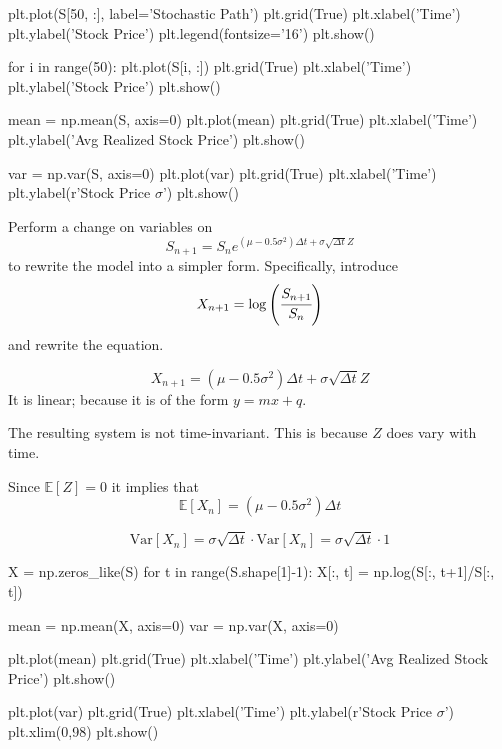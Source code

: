 \documentclass[12pt,a4paper]{book}
\begin{document}
\begin{solution}
\begin{ipython}
plt.plot(S[50, :], label='Stochastic Path')
plt.grid(True)
plt.xlabel('Time')
plt.ylabel('Stock Price')
plt.legend(fontsize='16')
plt.show()

for i in range(50):
    plt.plot(S[i, :])
plt.grid(True)
plt.xlabel('Time')
plt.ylabel('Stock Price')
plt.show()
\end{ipython}

\begin{ipython}
mean = np.mean(S, axis=0)
plt.plot(mean)
plt.grid(True)
plt.xlabel('Time')
plt.ylabel('Avg Realized Stock Price')
plt.show()

var = np.var(S, axis=0)
plt.plot(var)
plt.grid(True)
plt.xlabel('Time')
plt.ylabel(r'Stock Price $\sigma$')
plt.show()
\end{ipython}

Perform a change on variables on
$$S_{n+1} = S_ne^{(\mu-0.5\sigma^2)\Delta t + \sigma\sqrt{\Delta t}Z}$$
to rewrite the model into a simpler form. Specifically, introduce
$$X_{n+1}=\log\left(\cfrac{S_{n+1}}{S_n}\right)$$ and rewrite the equation.

$$X_{n+1} = (\mu-0.5\sigma^2)\Delta t + \sigma\sqrt{\Delta t}Z$$
It is linear; because it is of the form $y = mx + q$.

The resulting system is not time-invariant. This is because $Z$ does vary with time.

Since $\mathbb{E}[Z]=0$ it implies that
$$\mathbb{E}[X_n] = (\mu-0.5\sigma^2)\Delta t$$

$$\text{Var}[X_n] = \sigma\sqrt{\Delta t}\cdot\text{Var}[X_n] = \sigma\sqrt{\Delta t}\cdot 1$$

\begin{ipython}
X = np.zeros_like(S)
for t in range(S.shape[1]-1):
    X[:, t] = np.log(S[:, t+1]/S[:, t])

mean = np.mean(X, axis=0)
var = np.var(X, axis=0)

plt.plot(mean)
plt.grid(True)
plt.xlabel('Time')
plt.ylabel('Avg Realized Stock Price')
plt.show()

plt.plot(var)
plt.grid(True)
plt.xlabel('Time')
plt.ylabel(r'Stock Price $\sigma$')
plt.xlim(0,98)
plt.show()
\end{ipython}
\end{solution}
\end{document}
